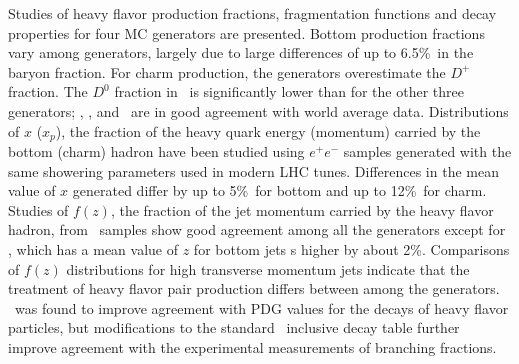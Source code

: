 Studies of heavy flavor production fractions, fragmentation functions and decay properties 
for four MC generators are presented.
Bottom production fractions vary among generators, largely due to large differences
of up to 6.5\%\ in the baryon fraction.  For charm production, 
the generators overestimate the $D^+$ fraction.  The $D^0$ fraction
in \Herwig\ is significantly lower than for the other three generators; \Herwig, \Pythia, and
\PythiaE\ are in good agreement with world average data.
Distributions of $x$ ($x_p$), the fraction of the heavy quark energy (momentum) carried by
the bottom (charm) hadron have been studied using $e^+e^-$ samples generated
with the same showering parameters used in modern LHC tunes.  Differences in the mean value of $x$  
generated differ by up to 5\%\ for bottom and up to 12\%\ for charm.  Studies of $f(z)$,
the fraction of the jet momentum carried by the heavy flavor hadron, from \ttbar\ samples
show good agreement among all the generators except for \Herwigpp, which has a
mean value of $z$ for bottom jets s higher by about 2\%.  Comparisons of $f(z)$ distributions for
high transverse momentum jets indicate that the treatment of heavy flavor pair production
differs between among the generators.
\EvtGen\ was found to improve agreement with PDG values for the decays of heavy flavor particles, but modifications to the standard \EvtGen\ inclusive decay table further improve agreement with the experimental measurements of branching fractions.
